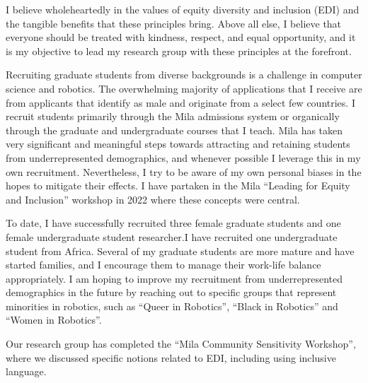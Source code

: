 \documentclass[english,
]{nserc-alliance}
\begin{document}
I believe wholeheartedly in the values of equity diversity and inclusion (EDI) and the tangible benefits that these principles bring. Above all else, I believe that everyone should be treated with kindness, respect, and equal opportunity, and it is my objective to lead my research group with these principles at the forefront.



Recruiting graduate students from diverse backgrounds is a challenge in computer science and robotics. The overwhelming majority of applications that I receive are from applicants that identify as male and originate from a select few countries. I recruit students primarily through the Mila admissions system or organically through the graduate and undergraduate courses that I teach. Mila has taken very significant and meaningful steps towards attracting and retaining students from underrepresented demographics, and whenever possible I leverage this in my own recruitment.
Nevertheless, I try to be aware of my own personal biases in the hopes to mitigate their effects. I have partaken in the Mila ``Leading for Equity and Inclusion'' workshop in 2022 where these concepts were central.


To date, I have successfully recruited three female graduate students and one female undergraduate student researcher.I have recruited one undergraduate student from Africa. Several of my graduate students are more mature and have started families, and I encourage them to manage their work-life balance appropriately. I am hoping to improve my recruitment from underrepresented demographics in the future by reaching out to specific groups that represent minorities in robotics, such as ``Queer in Robotics'', ``Black in Robotics'' and ``Women in Robotics''.  



Our research group has completed the ``Mila Community Sensitivity Workshop'', where we discussed specific notions related to EDI, including using inclusive language. 
\end{document}
